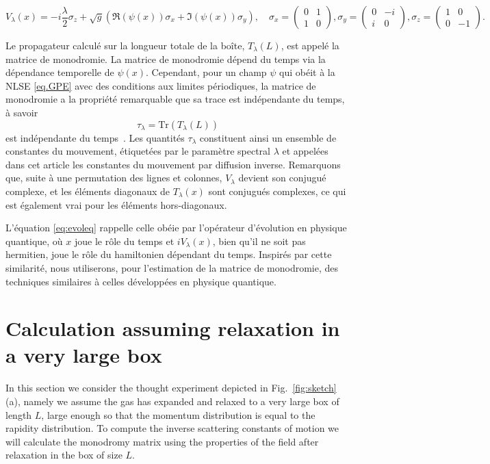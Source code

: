\documentclass[submission,Phys,10pt]{SciPost}%
\begin{document}
{{\begin{equation*}
    V_{\lambda}(x)= - i \frac{\lambda}2 \sigma_z  + \sqrt{g} ( \Re(\psi(x))\sigma_x + \Im( \psi(x))  \sigma_y ) ,\quad \sigma_x =  
    \begin{pmatrix} 
    0 & 1\\
    1 & 0 
    \end{pmatrix},
    \sigma_y =  
    \begin{pmatrix} 
    0 & -i\\
    i & 0 
    \end{pmatrix},
    \sigma_z =  
    \begin{pmatrix} 
    1 & 0\\
    0& -1 
    \end{pmatrix}.
\end{equation*}

} 
Le propagateur calculé sur la longueur totale de la boîte, $T_\lambda(L)$, est appelé la matrice de monodromie. La matrice de monodromie dépend du temps via la dépendance temporelle de $\psi(x)$. Cependant, pour un champ $\psi$ qui obéit à la NLSE \eqref{eq.GPE} avec des conditions aux limites périodiques, la matrice de monodromie a la propriété remarquable que sa trace est indépendante du temps, à savoir
\begin{equation}
    \tau_\lambda=\mathrm{Tr}(T_\lambda(L))
    \label{eq:tau}
\end{equation}
est indépendante du temps~\cite{korepin_quantum_1993}. Les quantités $\tau_\lambda$ constituent ainsi un ensemble de constantes du mouvement, étiquetées par le paramètre spectral $\lambda$ et appelées dans cet article les constantes du mouvement par diffusion inverse. Remarquons que, suite à une permutation des lignes et colonnes, $V_\lambda$ devient son conjugué complexe, et les éléments diagonaux de $T_\lambda(x)$ sont conjugués complexes, ce qui est également vrai pour les éléments hors-diagonaux.

L'équation \eqref{eq:evoleq} rappelle celle obéie par l'opérateur d'évolution en physique quantique, où $x$ joue le rôle du temps et $iV_\lambda(x)$, bien qu'il ne soit pas hermitien, joue le rôle du hamiltonien dépendant du temps. Inspirés par cette similarité, nous utiliserons, pour l'estimation de la matrice de monodromie, des techniques similaires à celles développées en physique quantique.
}

\section{Calculation assuming relaxation in a very large box}
\label{sec:markov}
In this section we consider the thought experiment depicted in Fig.~\ref{fig:sketch}(a), namely we assume the gas has expanded and relaxed to a very large box of length $L$, large enough so that the momentum distribution is equal to the rapidity distribution.
To compute the inverse scattering constants of motion we will calculate the monodromy matrix using the properties of the field after relaxation in the box of size $L$.
\end{document}
